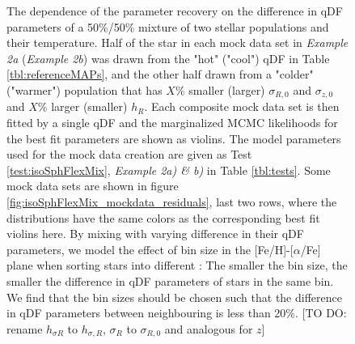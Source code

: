 \addtocounter{figure}{-1}
\begin{figure} [t!]
\caption{The dependence of the parameter recovery on the difference in qDF parameters of a 50\%/50\% mixture of two stellar populations and their temperature. Half of the star in each mock data set in \emph{Example 2a} (\emph{Example 2b}) was drawn from the "hot" ("cool") qDF in Table \ref{tbl:referenceMAPs}, and the other half drawn from a "colder" ("warmer") population that has $X\%$ smaller (larger) $\sigma_{R,0}$ and $\sigma_{z,0}$ and $X\%$ larger (smaller) $h_R$. Each composite mock data set is then fitted by a single qDF and the marginalized MCMC likelihoods for the best fit parameters are shown as violins. The model parameters used for the mock data creation are given as Test \ref{test:isoSphFlexMix}, \emph{Example 2a) \& b)} in Table \ref{tbl:tests}. Some mock data sets are shown in figure \ref{fig:isoSphFlexMix_mockdata_residuals}, last two rows, where the distributions have the same colors as the corresponding best fit violins here. By mixing \MAPs with varying difference in their qDF parameters, we model the effect of bin size in the [Fe/H]-[$\alpha$/Fe] plane when sorting stars into different \MAPs: The smaller the bin size, the smaller the difference in qDF parameters of stars in the same bin. We find that the bin sizes should be chosen such that the difference in qDF parameters between neighbouring \MAPs is less than 20\%. [TO DO: rename $h_{\sigma R}$ to $h_{\sigma,R}$, $\sigma_R$ to $\sigma_{R,0}$ and analogous for $z$]} 
\label{fig:isoSphFlexMixDiff}
\end{figure}

